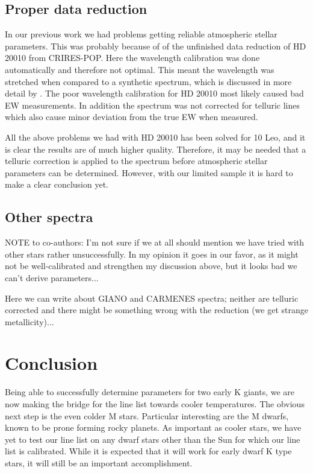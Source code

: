 \documentclass{aa}
\begin{document}
\subsection{Proper data reduction}

In our previous work we had problems getting reliable atmospheric stellar
parameters. This was probably because of of the unfinished data reduction of HD
20010 from CRIRES-POP. Here the wavelength calibration was done automatically
and therefore not optimal. This meant the wavelength was stretched when compared
to a synthetic spectrum, which is discussed in more detail by
\citet{Nicholls2016}. The poor wavelength calibration for HD 20010 most likely
caused bad EW measurements. In addition the spectrum was not corrected for
telluric lines which also cause minor deviation from the true EW when measured.

All the above problems we had with HD 20010 has been solved for 10 Leo, and it is
clear the results are of much higher quality. Therefore, it may be needed that a
telluric correction is applied to the spectrum before atmospheric stellar
parameters can be determined. However, with our limited sample it is hard to
make a clear conclusion yet.

\subsection{Other spectra}

NOTE to co-authors: I'm not sure if we at all should mention we have tried with
other stars rather unsuccessfully. In my opinion it goes in our favor, as it
might not be well-calibrated and strengthen my discussion above, but it looks
bad we can't derive parameters...

Here we can write about GIANO and CARMENES spectra; neither are telluric
corrected and there might be something wrong with the reduction (we get strange
metallicity)...





\section{Conclusion}
\label{sec:conclusion}

Being able to successfully determine parameters for two early K giants, we are
now making the bridge for the line list towards cooler temperatures. The obvious
next step is the even colder M stars. Particular interesting are the M dwarfs,
known to be prone forming rocky planets. As important as cooler stars, we have
yet to test our line list on any dwarf stars other than the Sun for which our
line list is calibrated. While it is expected that it will work for early dwarf
K type stars, it will still be an important accomplishment.
\end{document}
